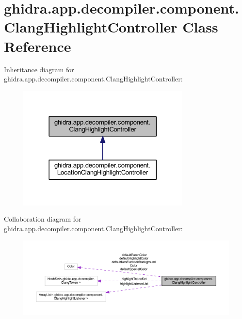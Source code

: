 \hypertarget{classghidra_1_1app_1_1decompiler_1_1component_1_1_clang_highlight_controller}{}\section{ghidra.\+app.\+decompiler.\+component.\+Clang\+Highlight\+Controller Class Reference}
\label{classghidra_1_1app_1_1decompiler_1_1component_1_1_clang_highlight_controller}


Inheritance diagram for ghidra.\+app.\+decompiler.\+component.\+Clang\+Highlight\+Controller\+:
\nopagebreak
\begin{figure}[H]
\begin{center}
\leavevmode
\includegraphics[width=246pt]{classghidra_1_1app_1_1decompiler_1_1component_1_1_clang_highlight_controller__inherit__graph}
\end{center}
\end{figure}


Collaboration diagram for ghidra.\+app.\+decompiler.\+component.\+Clang\+Highlight\+Controller\+:
\nopagebreak
\begin{figure}[H]
\begin{center}
\leavevmode
\includegraphics[width=350pt]{classghidra_1_1app_1_1decompiler_1_1component_1_1_clang_highlight_controller__coll__graph}
\end{center}
\end{figure}
